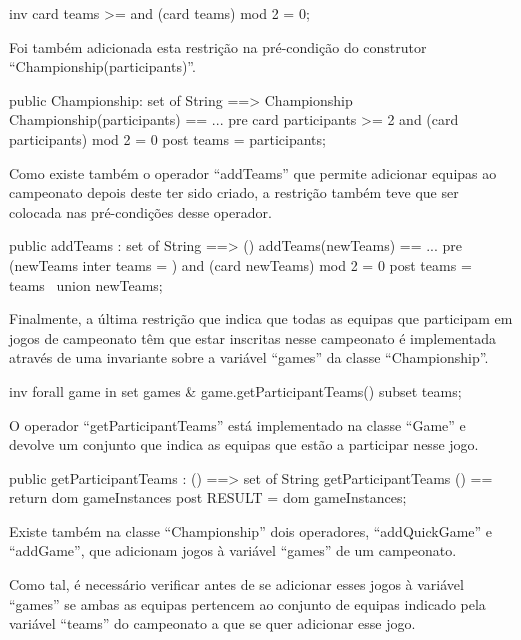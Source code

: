 \begin{vdm_al}
  inv card teams >= and (card teams) mod 2 = 0;  
\end{vdm_al}

Foi também adicionada esta restrição na pré-condição do construtor
``Championship(participants)''.

\begin{vdm_al}
  public Championship: set of String ==> Championship
  Championship(participants) == ...
  pre card participants >= 2 and (card participants) mod 2 = 0
  post teams = participants;
\end{vdm_al}

Como existe também o operador ``addTeams'' que permite adicionar
equipas ao campeonato depois deste ter sido criado, a restrição também
teve que ser colocada nas pré-condições desse operador.

\begin{vdm_al}
  public addTeams : set of String ==> ()
  addTeams(newTeams) == ...
  pre (newTeams inter teams = {}) and (card newTeams) mod 2 = 0
  post teams = teams~ union newTeams;
\end{vdm_al}

Finalmente, a última restrição que indica que todas as equipas que
participam em jogos de campeonato têm que estar inscritas nesse
campeonato é implementada através de uma invariante sobre a variável
``games'' da classe ``Championship''.

\begin{vdm_al}
  inv forall game in set games & game.getParticipantTeams() subset teams;  
\end{vdm_al}

O operador ``getParticipantTeams'' está implementado na classe
``Game'' e devolve um conjunto que indica as equipas que estão a
participar nesse jogo.

\begin{vdm_al}
  public getParticipantTeams : () ==> set of String
  getParticipantTeams () == return dom gameInstances
  post RESULT = dom gameInstances;
\end{vdm_al}

Existe também na classe ``Championship'' dois operadores,
``addQuickGame'' e ``addGame'', que adicionam jogos à variável
``games'' de um campeonato.

Como tal, é necessário verificar antes de se adicionar esses jogos à
variável ``games'' se ambas as equipas pertencem ao conjunto de
equipas indicado pela variável ``teams'' do campeonato a que se quer
adicionar esse jogo.

